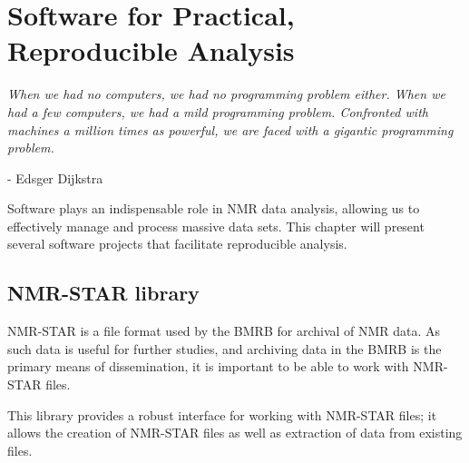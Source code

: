 \chapter{Software for Practical, Reproducible Analysis}

\begin{center}
  \textit{When we had no computers, we had no programming problem either. 
    When we had a few computers, we had a mild programming problem. Confronted 
    with machines a million times as powerful, we are faced with a gigantic 
    programming problem.}

 - Edsger Dijkstra
\end{center}

Software plays an indispensable role in NMR data analysis, allowing us
to effectively manage and process massive data sets.  This chapter will
present several software projects that facilitate reproducible analysis.


\section{NMR-STAR library}
NMR-STAR is a file format used by the BMRB \cite{bmrb} for archival of
NMR data.  As such data is useful for further studies, and archiving
data in the BMRB is the primary means of dissemination, it is important
to be able to work with NMR-STAR files.

This library provides a robust interface for working with NMR-STAR files; 
it allows the creation of NMR-STAR files as well as extraction of data from 
existing files.

